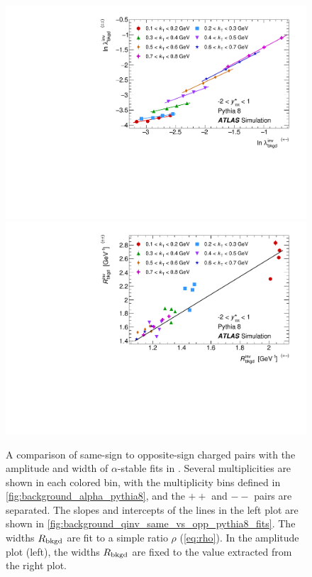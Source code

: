 \begin{figure}[t]
\centering
\includegraphics[width=.49\linewidth]{qinv_pythia8_backLambda_kt_opp_vs_same.pdf}
\includegraphics[width=.49\linewidth]{qinv_pythia8_backR_kt_opp_vs_same.pdf}
\caption{A comparison of same-sign to opposite-sign charged pairs with the amplitude and width of $\alpha$-stable fits in . Several multiplicities are shown in each colored \kt bin, with the multiplicity bins defined in \cref{fig:background_alpha_pythia8}, and the $++$ and $--$ pairs are separated. The slopes and intercepts of the lines in the left plot are shown in \cref{fig:background_qinv_same_vs_opp_pythia8_fits}. The widths $R_{\mathrm{bkgd}}$ are fit to a simple ratio $\rho$ (\cref{eq:rho}). In the amplitude plot (left), the widths $R_{\mathrm{bkgd}}$ are fixed to the value extracted from the right plot.}
\label{fig:background_qinv_same_vs_opp_pythia8}
\end{figure}

